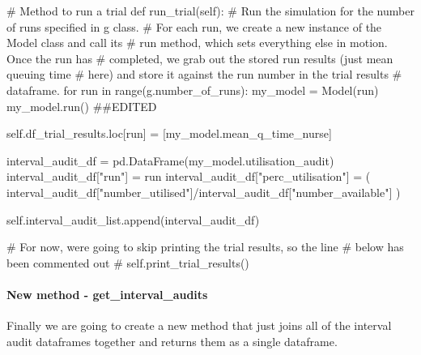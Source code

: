 \documentclass[
  letterpaper,
  DIV=11,
  numbers=noendperiod]{scrreprt}
\let\oldparagraph\paragraph
\renewcommand{\paragraph}[1]{\oldparagraph{#1}\mbox{}}
\newenvironment{Shaded}{\begin{snugshade}}{\end{snugshade}}
\newcommand{\BuiltInTok}[1]{\textcolor[rgb]{0.00,0.23,0.31}{#1}}
\newcommand{\CommentTok}[1]{\textcolor[rgb]{0.37,0.37,0.37}{#1}}
\newcommand{\ControlFlowTok}[1]{\textcolor[rgb]{0.00,0.23,0.31}{#1}}
\newcommand{\KeywordTok}[1]{\textcolor[rgb]{0.00,0.23,0.31}{#1}}
\newcommand{\NormalTok}[1]{\textcolor[rgb]{0.00,0.23,0.31}{#1}}
\newcommand{\OperatorTok}[1]{\textcolor[rgb]{0.37,0.37,0.37}{#1}}
\newcommand{\StringTok}[1]{\textcolor[rgb]{0.13,0.47,0.30}{#1}}
\newcommand{\VariableTok}[1]{\textcolor[rgb]{0.07,0.07,0.07}{#1}}
\begin{document}
\begin{Shaded}
\begin{Highlighting}[]
\CommentTok{\# Method to run a trial}
\KeywordTok{def}\NormalTok{ run\_trial(}\VariableTok{self}\NormalTok{):}
        \CommentTok{\# Run the simulation for the number of runs specified in g class.}
        \CommentTok{\# For each run, we create a new instance of the Model class and call its}
        \CommentTok{\# run method, which sets everything else in motion.  Once the run has}
        \CommentTok{\# completed, we grab out the stored run results (just mean queuing time}
        \CommentTok{\# here) and store it against the run number in the trial results}
        \CommentTok{\# dataframe.}
        \ControlFlowTok{for}\NormalTok{ run }\KeywordTok{in} \BuiltInTok{range}\NormalTok{(g.number\_of\_runs):}
\NormalTok{            my\_model }\OperatorTok{=}\NormalTok{ Model(run)}
\NormalTok{            my\_model.run() }\CommentTok{\#\#EDITED}

            \VariableTok{self}\NormalTok{.df\_trial\_results.loc[run] }\OperatorTok{=}\NormalTok{ [my\_model.mean\_q\_time\_nurse]}

\NormalTok{            interval\_audit\_df }\OperatorTok{=}\NormalTok{ pd.DataFrame(my\_model.utilisation\_audit)}
\NormalTok{            interval\_audit\_df[}\StringTok{"run"}\NormalTok{] }\OperatorTok{=}\NormalTok{ run}
\NormalTok{            interval\_audit\_df[}\StringTok{"perc\_utilisation"}\NormalTok{] }\OperatorTok{=}\NormalTok{ (}
\NormalTok{              interval\_audit\_df[}\StringTok{"number\_utilised"}\NormalTok{]}\OperatorTok{/}\NormalTok{interval\_audit\_df[}\StringTok{"number\_available"}\NormalTok{]}
\NormalTok{            )}

            \VariableTok{self}\NormalTok{.interval\_audit\_list.append(interval\_audit\_df)}

        \CommentTok{\# For now, we\textquotesingle{}re going to skip printing the trial results, so the line}
        \CommentTok{\# below has been commented out}
        \CommentTok{\# self.print\_trial\_results()}
\end{Highlighting}
\end{Shaded}

\paragraph{New method -
get\_interval\_audits}\label{new-method---get_interval_audits}

Finally we are going to create a new method that just joins all of the
interval audit dataframes together and returns them as a single
dataframe.
\end{document}
